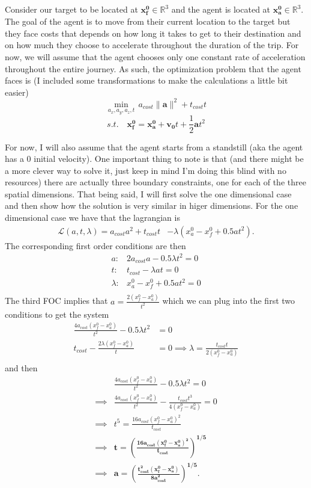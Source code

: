 \documentclass[11pt,english]{article}
\begin{document}
\noindent Consider our target to be located at $\mathbf{x_f^0}\in \mathbb{R}^3$ and the agent is located at $\mathbf{x_a^0}\in \mathbb{R}^3$. The goal of the agent is to move from their current location to the target but they face costs that depends on how long it takes to get to their destination and on how much they choose to accelerate throughout the duration of the trip. For now, we will assume that the agent chooses only one constant rate of acceleration throughout the entire journey. As such, the optimization problem that the agent faces is (I included some transformations to make the calculations a little bit easier) $$\min_{a_x,a_y,a_z,t}\,a_{cost}\lVert\mathbf{a}\rVert^2 + t_{cost}t$$ $$s.t. \quad \mathbf{x_f^0} = \mathbf{x_a^0} + \mathbf{v_0}t + \frac{1}{2}\mathbf{a}t^2$$

\noindent For now, I will also assume that the agent starts from a standstill (aka the agent has a 0 initial velocity). One important thing to note is that (and there might be a more clever way to solve it, just keep in mind I'm doing this blind with no resources) there are actually three boundary constraints, one for each of the three spatial dimensions. That being said, I will first solve the one dimensional case and then show how the solution is very similar in higer dimensions. For the one dimensional case we have that the lagrangian is
\begin{align*}
	\mathcal{L}(a,t,\lambda) = a_{cost}a^2 + t_{cost}t &- \lambda(x_{a}^0 - x_{f}^0 + 0.5at^2).
\end{align*}
The corresponding first order conditions are then
\begin{align*}
a:& 2a_{cost}a - 0.5\lambda t^2 = 0\\
t:& t_{cost} - \lambda at = 0\\
\lambda:& x_{a}^0 - x_{f}^0 + 0.5at^2 = 0\\
\end{align*}
The third FOC implies that $a = \frac{2(x_f^0 - x_a^0)}{t^2}$ which we can plug into the first two conditions to get the system
\begin{align*}
\frac{4a_{cost}(x_f^0 - x_a^0)}{t^2} - 0.5\lambda t^2 &= 0  \\
t_{cost} - \frac{2\lambda (x_f^0 - x_a^0)}{t}  &= 0 \implies \lambda = \frac{t_{cost}t}{2(x_f^0 - x_a^0)}\\
\end{align*} and then 
\begin{align*}
& \frac{4a_{cost}(x_f^0 - x_a^0)}{t^2} - 0.5\lambda t^2 = 0  \\
\implies & \frac{4a_{cost}(x_f^0 - x_a^0)}{t^2} -  \frac{t_{cost}t^3}{4(x_f^0 - x_a^0)} = 0  \\
\implies & t^5 = \frac{16a_{cost}(x_f^0 - x_a^0)^2}{t_{cost}}\\
\implies & \pmb{t = \left(\frac{16a_{cost}(x_f^0 - x_a^0)^2}{t_{cost}}\right)^{1/5}}\\
\implies & \pmb{a = \left(\frac{t_{cost}^2(x_f^0 - x_a^0)}{8a_{cost}^2}\right)^{1/5}}.
\end{align*}
\end{document}
